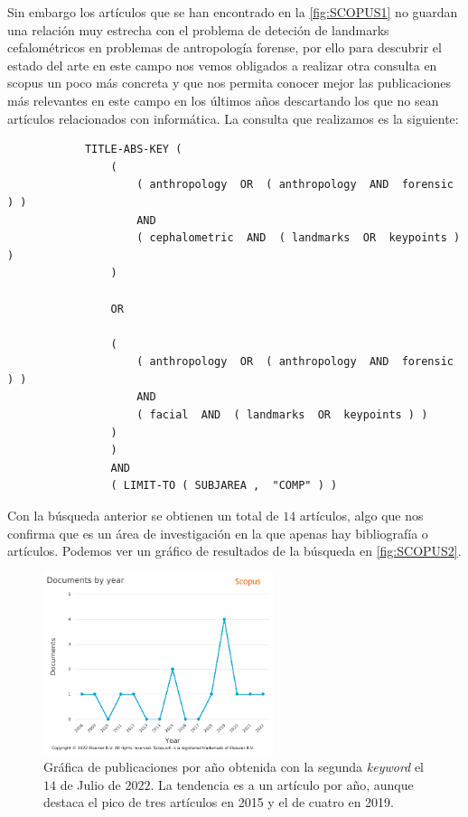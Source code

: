         \medskip

        \noindent Sin embargo los artículos que se han encontrado en la \autoref{fig:SCOPUS1} no guardan una relación muy estrecha con el problema de deteción de landmarks cefalométricos en problemas de antropología forense, por ello para descubrir el estado del arte en este campo nos vemos obligados a realizar otra consulta en scopus un poco más concreta y que nos permita conocer mejor las publicaciones más relevantes en este campo en los últimos años descartando los que no sean artículos relacionados con informática. La consulta que realizamos es la siguiente: 

        \begin{verbatim}
            TITLE-ABS-KEY ( 
                ( 
                    ( anthropology  OR  ( anthropology  AND  forensic ) )  
                    AND  
                    ( cephalometric  AND  ( landmarks  OR  keypoints ) ) 
                )  
                
                OR  
                
                ( 
                    ( anthropology  OR  ( anthropology  AND  forensic ) )  
                    AND  
                    ( facial  AND  ( landmarks  OR  keypoints ) ) 
                ) 
                )  
                AND  
                ( LIMIT-TO ( SUBJAREA ,  "COMP" ) )
        \end{verbatim}

        \medskip

        \noindent Con la búsqueda anterior se obtienen un total de $14$ artículos, algo que nos confirma que es un área de investigación en la que apenas hay bibliografía o artículos. Podemos ver un gráfico de resultados de la búsqueda en \autoref{fig:SCOPUS2}.

        \begin{figure}[htpb]
            \centering
            \includegraphics[width=0.6\textwidth]{img/Scopus_2.png}
            \caption{Gráfica de publicaciones por año obtenida con la segunda \textit{keyword} el $14$ de Julio de $2022$. La tendencia es a un artículo por año, aunque destaca el pico de tres artículos en 2015 y el de cuatro en 2019.}
            \label{fig:SCOPUS2}
        \end{figure}

